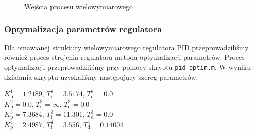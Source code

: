 \begin{figure}
    \begin{subfigure}[b]{\textwidth}
        \centering
    \end{subfigure}
    \caption{Wejścia procesu wielowymiarowego}
    \label{pro_pid_2_in}
\end{figure}
\FloatBarrier

\subsubsection{Optymalizacja parametrów regulatora}

Dla omawianej struktury wielowymiarowego regulatora PID przeprowadziliśmy również proces 
strojenia regulatora metodą optymalizacji parametrów. Proces optymalizacji przeprowadziliśmy
przy pomocy skryptu \verb+pid_optim.m+. W wyniku działania skryptu uzyskaliśmy następujący 
szereg parametrów:\\

\begin{center}
    $K^{\num{1}}_{\mathrm{p}} = \num{1.2189}$, $T^{\num{1}}_{\mathrm{i}} = \num{3.5174}$, $T^{\num{1}}_{\mathrm{d}} = \num{0.0}$ \\
    $K^{\num{2}}_{\mathrm{p}} = \num{0.0}$, $T^{\num{2}}_{\mathrm{i}} = \infty$, $T^{\num{2}}_{\mathrm{d}} = \num{0.0}$ \\
    $K^{\num{3}}_{\mathrm{p}} = \num{7.3684}$, $T^{\num{3}}_{\mathrm{i}} = \num{11.301}$, $T^{\num{3}}_{\mathrm{d}} = \num{0.0}$ \\
    $K^{\num{4}}_{\mathrm{p}} = \num{2.4987}$, $T^{\num{4}}_{\mathrm{i}} = \num{3.556}$, $T^{\num{4}}_{\mathrm{d}} = \num{0.14004}$ \\
\end{center}

